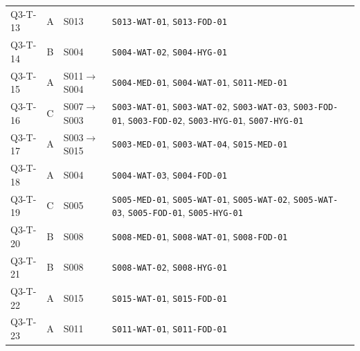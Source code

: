 \begin{longtable}{@{}lc>{\raggedright\arraybackslash}p{2.8cm}>{\raggedright\arraybackslash}p{8.8cm}@{}}
Q3-T-13 & A & S013 & \texttt{S013-WAT-01}\allowbreak, \texttt{S013-FOD-01}\allowbreak\\
Q3-T-14 & B & S004 & \texttt{S004-WAT-02}\allowbreak, \texttt{S004-HYG-01}\allowbreak\\
Q3-T-15 & A & S011$\to$S004 & \texttt{S004-MED-01}\allowbreak, \texttt{S004-WAT-01}\allowbreak, \texttt{S011-MED-01}\allowbreak\\
Q3-T-16 & C & S007$\to$S003 & \texttt{S003-WAT-01}\allowbreak, \texttt{S003-WAT-02}\allowbreak, \texttt{S003-WAT-03}\allowbreak, \texttt{S003-FOD-01}\allowbreak, \texttt{S003-FOD-02}\allowbreak, \texttt{S003-HYG-01}\allowbreak, \texttt{S007-HYG-01}\allowbreak\\
Q3-T-17 & A & S003$\to$S015 & \texttt{S003-MED-01}\allowbreak, \texttt{S003-WAT-04}\allowbreak, \texttt{S015-MED-01}\allowbreak\\
Q3-T-18 & A & S004 & \texttt{S004-WAT-03}\allowbreak, \texttt{S004-FOD-01}\allowbreak\\
Q3-T-19 & C & S005 & \texttt{S005-MED-01}\allowbreak, \texttt{S005-WAT-01}\allowbreak, \texttt{S005-WAT-02}\allowbreak, \texttt{S005-WAT-03}\allowbreak, \texttt{S005-FOD-01}\allowbreak, \texttt{S005-HYG-01}\allowbreak\\
Q3-T-20 & B & S008 & \texttt{S008-MED-01}\allowbreak, \texttt{S008-WAT-01}\allowbreak, \texttt{S008-FOD-01}\allowbreak\\
Q3-T-21 & B & S008 & \texttt{S008-WAT-02}\allowbreak, \texttt{S008-HYG-01}\allowbreak\\
Q3-T-22 & A & S015 & \texttt{S015-WAT-01}\allowbreak, \texttt{S015-FOD-01}\allowbreak\\
Q3-T-23 & A & S011 & \texttt{S011-WAT-01}\allowbreak, \texttt{S011-FOD-01}\allowbreak\\
\bottomrule
\end{longtable}
